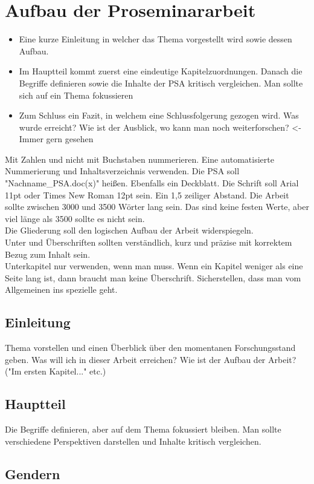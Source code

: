\documentclass{article}
\begin{document}
	\section{Aufbau der Proseminararbeit}
	\begin{itemize}
		\item{Eine kurze Einleitung in welcher das Thema vorgestellt wird sowie dessen Aufbau.}
		\item{Im Hauptteil kommt zuerst eine eindeutige Kapitelzuordnungen. Danach die Begriffe definieren sowie die Inhalte der PSA kritisch vergleichen. Man sollte sich auf ein Thema fokussieren}
		\item{Zum Schluss ein Fazit, in welchem eine Schlussfolgerung gezogen wird. Was wurde erreicht? Wie ist der Ausblick, wo kann man noch weiterforschen? <- Immer gern gesehen}
	\end{itemize}
	Mit Zahlen und nicht mit Buchstaben nummerieren.
	Eine automatisierte Nummerierung und Inhaltsverzeichnis verwenden.
	Die PSA soll "Nachname_PSA.doc(x)" heißen. Ebenfalls ein Deckblatt. Die Schrift soll Arial 11pt oder Times New Roman 12pt sein. Ein 1,5 zeiliger Abstand. Die Arbeit sollte zwischen 3000 und 3500 Wörter lang sein. Das sind keine festen Werte, aber viel länge als 3500 sollte es nicht sein. \\
	Die Gliederung soll den logischen Aufbau der Arbeit widerspiegeln. \\
	Unter und Überschriften sollten verständlich, kurz und präzise mit korrektem Bezug zum Inhalt sein. \\
	Unterkapitel nur verwenden, wenn man muss. Wenn ein Kapitel weniger als eine Seite lang ist, dann braucht man keine Überschrift. Sicherstellen, dass man vom Allgemeinen ins spezielle geht. \\
	\subsection{Einleitung}
	Thema vorstellen und einen Überblick über den momentanen Forschungsstand geben. Was will ich in dieser Arbeit erreichen? Wie ist der Aufbau der Arbeit? ("Im ersten Kapitel..." etc.) \\
	\subsection{Hauptteil}
	Die Begriffe definieren, aber auf dem Thema fokussiert bleiben. Man sollte verschiedene Perspektiven darstellen und Inhalte kritisch vergleichen. \\
	\subsection{Gendern}
	


	

	
\end{document}
